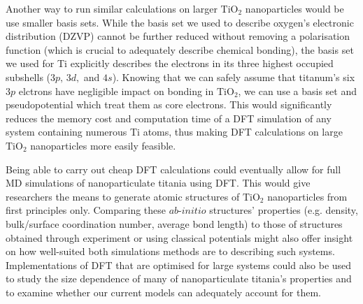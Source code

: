 \documentclass[aps,prb,twocolumn,amsmath,amssymb,superscriptaddress,longbibliography]{revtex4-1}
\newcommand\tab[1][1cm]{\hspace*{#1}} %
\begin{document}
\tab Another way to run similar calculations on larger $\text{TiO}_2$ nanoparticles would be use smaller basis sets.
While the basis set we used to describe oxygen's electronic distribution (DZVP) cannot be further reduced without removing a polarisation function (which is crucial to adequately describe chemical bonding), the basis set we used for Ti explicitly describes the electrons in its three highest occupied subshells ($3p,\,3d,$ and $4s$).
Knowing that we can safely assume that titanum's six $3p$ elctrons have negligible impact on bonding in $\text{TiO}_2$\cite{electronic_structure}, we can use a basis set and pseudopotential which treat them as core electrons.
This would significantly reduces the memory cost and computation time of a DFT simulation of any system containing numerous Ti atoms, thus making DFT calculations on large $\text{TiO}_2$ nanoparticles more easily feasible.

\tab Being able to carry out cheap DFT calculations could eventually allow for full MD simulations of nanoparticulate titania using DFT.
This would give researchers the means to generate atomic structures of $\text{TiO}_2$ nanoparticles from first principles only. 
Comparing these $\textit{ab-initio}$ structures' properties (e.g. density, bulk/surface coordination number, average bond length) to those of structures obtained through experiment or using classical potentials might also offer insight on how well-suited both simulations methods are to describing such systems.
Implementations of DFT that are optimised for large systems could also be used to study the size dependence of many of nanoparticulate titania's properties and to examine whether our current models can adequately account for them. 
\end{document}

